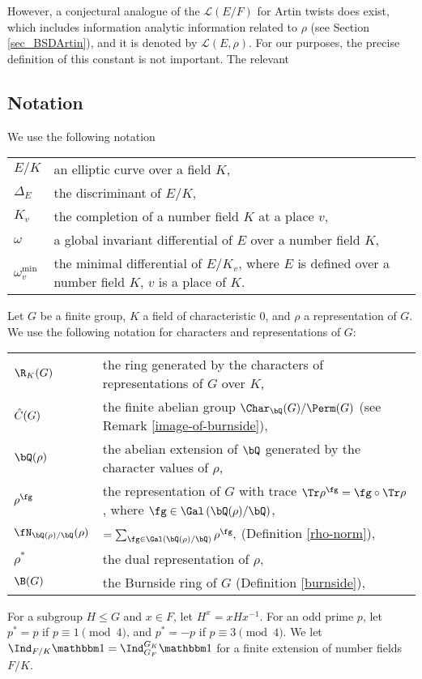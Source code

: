 However, a conjectural analogue of the $\mathcal{L}(E/F)$ for Artin twists does exist, which includes information analytic information related to $\rho$ (see Section \ref{sec_BSDArtin}), and it is denoted by $\mathcal{L}(E,\rho)$. For our purposes, the precise definition of this constant is not important. The relevant 


\subsection*{Notation}

We use the following notation\newline

\begin{tabular}{l | l}
    $E / K$ & an elliptic curve over a field $K$,\\
    $\Delta_E$ & the discriminant of $E / K$,\\
    $K_v$  & the completion of a number field $K$ at a place $v$, \\
    $\omega$ & a global invariant differential of $E$ over a number field $K$,\\
    $\omega_v^{\min}$ & the minimal differential of $E / K_{v}$, where $E$ is defined over a number field $K$, $v$ is a place of $K$. 
\end{tabular}\newline

Let $G$ be a finite group, $K$ a field of characteristic $0$, and $\rho$ a representation of $G$. We use the following notation for characters and representations of $G$:

\bigskip

\begin{tabular}{l | l}
     $\R_{K}(G)$ & the ring generated by the characters of representations of $G$ over $K$,\\
    $\hat{C}(G)$ & the finite abelian group $\Char_{\bQ}(G) / \Perm(G)$ (see Remark \ref{image-of-burnside}), \\ 
    $\bQ(\rho)$ & the abelian extension of $\bQ$ generated by the character values of $\rho$, \\
    $\rho^{\fg}$ & the representation of $G$ with trace $\Tr \rho^{\fg} = \fg \circ \Tr \rho$, where $\fg \in \Gal\left(\bQ(\rho) / \bQ\right)$,\\
    $\repnorm{\rho}$ &  $ = \sum_{\fg \in \Gal(\bQ(\rho) / \bQ)} \rho^{\fg},$ (Definition \ref{rho-norm}),\\
    $\rho^*$ & the dual representation of $\rho$,
    \\
    $\B(G)$ & the Burnside ring of $G$ (Definition \ref{burnside}), \\
\end{tabular}
\vspace{1em}

For a subgroup $H \leq G$ and $x \in F$, let $H^{x} = x H x^{-1}$.  
For an odd prime $p$, let $p^* = p$ if $p \equiv 1 \pmod 4$, and $p^* = -p$ if $p \equiv 3 \pmod 4$. We let 
$\Ind_{F / K} \trivial  = \Ind_{G_F}^{G_K} \trivial$ for a finite extension of number fields $F / K$.